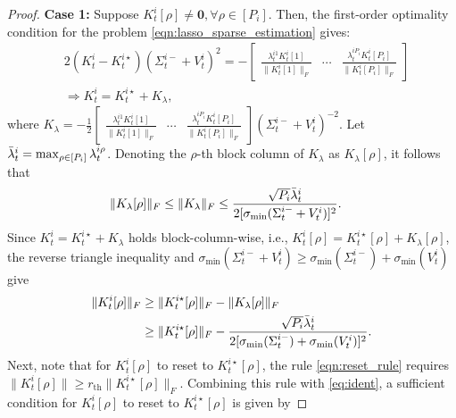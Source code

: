 \documentclass[letterpaper, 10 pt, conference]{ieeeconf}  %
\begin{document}
\begin{proof}
    \textbf{Case 1:} Suppose $K_t^i[\rho]\neq \textbf{0}, \forall\rho\in[P_i]$. Then, the first-order optimality condition for the problem \eqref{eqn:lasso_sparse_estimation} gives:
    \begin{equation*}
        \begin{aligned}
            &2(K_t^i-K_t^{i\star})(\Sigma_t^{i-}+V_t^i)^2=-\begin{bmatrix}
                \frac{\lambda_t^{i1}K_t^i[1]}{\|K_t^i[1]\|_F} & \cdots & \frac{\lambda_t^{iP_i}K_t^i[P_i]}{\|K_t^i[P_i]\|_F}
            \end{bmatrix}\\
            &\Rightarrow K_t^i=K_t^{i\star}+K_\lambda,
        \end{aligned}
    \end{equation*} 
    where $K_\lambda=-\frac{1}{2}\begin{bmatrix}
                \frac{\lambda_t^{i1}K_t^i[1]}{\|K_t^i[1]\|_F} & \cdots & \frac{\lambda_t^{iP_i}K_t^i[P_i]}{\|K_t^i[P_i]\|_F}
            \end{bmatrix}(\Sigma_t^{i-}+V_t^i)^{-2}$.
   Let $\Bar{\lambda}_t^i=\max_{\rho\in[P_i]}\lambda_t^{i\rho}$. Denoting the $\rho$-th block column of $K_\lambda$ as $K_\lambda[\rho]$, it follows that
    \begin{equation}
        \begin{aligned}
            \|K_\lambda[\rho]\|_F\leq\|K_\lambda\|_F&\leq 
            \frac{\sqrt{P_i}\Bar{\lambda}_t^i}{2[\sigma_\text{min}(\Sigma_t^{i-}+V_t^i)]^2}.\label{eqn:k_lambda_bound}
        \end{aligned}
    \end{equation}
    Since $K_t^i = K_t^{i\star} + K_\lambda$ holds block-column-wise, i.e., $K_t^i[\rho] = K_t^{i\star}[\rho] + K_\lambda[\rho]$, the reverse triangle inequality and $\sigma_\text{min}(\Sigma_t^{i-}+V_t^i)\geq\sigma_\text{min}(\Sigma_t^{i-})+\sigma_\text{min}(V_t^i)$ give
    \begin{align}\nonumber
            \|K_t^i[\rho]\|_F&\geq \|K_t^{i\star}[\rho]\|_F-\|K_\lambda[\rho]\|_F\\
            &\geq \|K_t^{i\star}[\rho]\|_F-\frac{\sqrt{P_i}\Bar{\lambda}_t^i}{2[\sigma_\text{min}(\Sigma_t^{i-})+\sigma_\text{min}(V_t^i)]^2}.\label{eq:ident}
     \end{align}
    Next, note that for $K_t^i[\rho]$ to reset to $K_t^{i\star}[\rho]$, the rule \eqref{eqn:reset_rule}  requires $\|K_t^i[\rho]\|\geq r_{\text{th}}\|K_t^{i\star}[\rho]\|_F$. Combining this rule with \eqref{eq:ident}, a sufficient condition for $K_t^i[\rho]$ to reset to $K_t^{i\star}[\rho]$ is given by

\end{proof}
\end{document}
